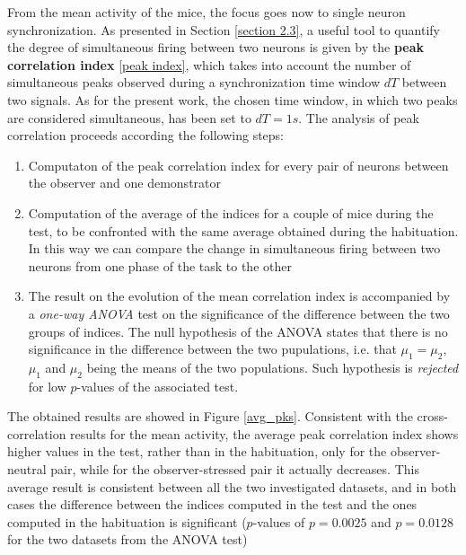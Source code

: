 \documentclass[12pt, a4paper]{report}
\begin{document}
From the mean activity of the mice, the focus goes now to single neuron synchronization. As presented in Section \ref{section 2.3}, a useful tool to quantify the degree of simultaneous firing between two neurons is given by the \textbf{peak correlation index} \ref{peak index}, which takes into account the number of simultaneous peaks observed during a synchronization time window $dT$ between two signals. As for the present work, the chosen time window, in which two peaks are considered simultaneous, has been set to $dT = 1 s$. The analysis of peak correlation proceeds according the following steps:

\begin{enumerate}
	
	\item Computaton of the peak correlation index for every pair of neurons between the observer and one demonstrator 
	
	\item Computation of the average of the indices for a couple of mice during the test, to be confronted with the same average obtained during the habituation. In this way we can compare the change in simultaneous firing between two neurons from one phase of the task to the other
	
	\item The result on the evolution of the mean correlation index is accompanied by a \textit{one-way ANOVA} test \cite{17} on the significance of the difference between the two groups of indices. The null hypothesis of the ANOVA states that there is no significance in the difference between the two pupulations, i.e. that $ \mu_1 = \mu_2$,  $\mu_1$  and $ \mu_2$ being the  means of the two populations. Such hypothesis is \textit{rejected} for low $p$-values of the associated test.
	
\end{enumerate}

The obtained results are showed in Figure \ref{avg_pks}. Consistent with the cross-correlation results for the mean activity, the average peak correlation index shows higher values in the test, rather than in the habituation, only for the observer-neutral pair, while for the observer-stressed pair it actually decreases. This average result is consistent between all the two investigated datasets, and in both cases the difference between the indices computed in the test and the ones computed in the habituation is significant ($p$-values of $p = 0.0025$ and $p = 0.0128$ for the two datasets from the ANOVA test)
\end{document}
